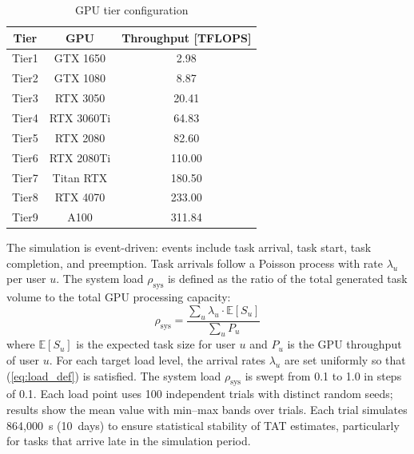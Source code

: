 %

\begin{table}[tb]
\centering
\caption{GPU tier configuration}
\label{tab:gpu_tiers}
\begin{tabular}{ccc}
\hline
Tier & GPU & Throughput [TFLOPS] \\ \hline
Tier1 & GTX 1650   &   2.98 \\
Tier2 & GTX 1080   &   8.87 \\
Tier3 & RTX 3050   &  20.41 \\
Tier4 & RTX 3060Ti &  64.83 \\
Tier5 & RTX 2080   &  82.60 \\
Tier6 & RTX 2080Ti & 110.00 \\
Tier7 & Titan RTX  & 180.50 \\
Tier8 & RTX 4070   & 233.00 \\
Tier9 & A100       & 311.84 \\ \hline
\end{tabular}
\end{table}

The simulation is event-driven: events include task arrival, task start,
task completion, and preemption.
Task arrivals follow a Poisson process with rate $\lambda_u$ per user $u$.
The system load $\rho_\mathrm{sys}$ is defined as the ratio of the total
generated task volume to the total GPU processing capacity:
\begin{equation}
  \rho_\mathrm{sys} = \frac{\sum_u \lambda_u \cdot \mathbb{E}[S_u]}
                           {\sum_u P_u}
  \label{eq:load_def}
\end{equation}
where $\mathbb{E}[S_u]$ is the expected task size for user $u$
and $P_u$ is the GPU throughput of user $u$.
For each target load level, the arrival rates $\lambda_u$ are set uniformly
so that (\ref{eq:load_def}) is satisfied.
The system load $\rho_\mathrm{sys}$ is swept from 0.1 to 1.0 in steps of 0.1.
Each load point uses 100 independent trials with distinct random seeds;
results show the mean value with min--max bands over trials.
Each trial simulates 864,000~s (10~days) to ensure statistical stability
of TAT estimates, particularly for tasks that arrive late in the simulation period.

